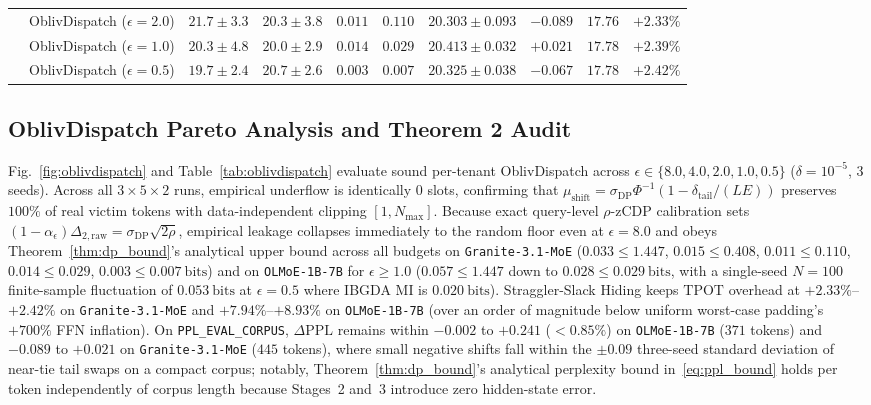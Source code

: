 \documentclass[final,5p,times,twocolumn]{elsarticle}
\def\OD{OblivDispatch}%
\theoremstyle{definition}
\theoremstyle{remark}
\newcommand{\OD}{\textsc{OblivDispatch}}
\begin{document}
\begin{table}[t]
{\begin{tabular}{llcccccccc}
      & \OD{} ($\epsilon = 2.0$) & $\mathbf{21.7 \pm 3.3}$ & $\mathbf{20.3 \pm 3.8}$ & $\mathbf{0.011}$ & $0.110$ & $20.303 \pm 0.093$ & $-0.089$ & $17.76$ & $+2.33\%$ \\
      & \OD{} ($\epsilon = 1.0$) & $\mathbf{20.3 \pm 4.8}$ & $\mathbf{20.0 \pm 2.9}$ & $\mathbf{0.014}$ & $0.029$ & $20.413 \pm 0.032$ & $+0.021$ & $17.78$ & $+2.39\%$ \\
      & \OD{} ($\epsilon = 0.5$) & $\mathbf{19.7 \pm 2.4}$ & $\mathbf{20.7 \pm 2.6}$ & $\mathbf{0.003}$ & $0.007$ & $20.325 \pm 0.038$ & $-0.067$ & $17.78$ & $+2.42\%$ \\
    \bottomrule
  \end{tabular}%
  }
\end{table}

\subsection{OblivDispatch Pareto Analysis and Theorem 2 Audit}
Fig.~\ref{fig:oblivdispatch} and Table~\ref{tab:oblivdispatch} evaluate sound per-tenant \OD{} across $\epsilon \in \{8.0, 4.0, 2.0, 1.0, 0.5\}$ ($\delta = 10^{-5}$, $3$ seeds). Across all $3 \times 5 \times 2$ runs, empirical underflow is identically $0$ slots, confirming that $\mu_{\mathrm{shift}} = \sigma_{\mathrm{DP}}\Phi^{-1}(1 - \delta_{\mathrm{tail}}/(LE))$ preserves $100\%$ of real victim tokens with data-independent clipping $[1, N_{\max}]$. Because exact query-level $\rho$-zCDP calibration sets $(1-\alpha_\epsilon)\Delta_{2,\mathrm{raw}} = \sigma_{\mathrm{DP}}\sqrt{2\rho}$, empirical leakage collapses immediately to the random floor even at $\epsilon = 8.0$ and obeys Theorem~\ref{thm:dp_bound}'s analytical upper bound across all budgets on \texttt{Granite-3.1-MoE} ($0.033 \le 1.447$, $0.015 \le 0.408$, $0.011 \le 0.110$, $0.014 \le 0.029$, $0.003 \le 0.007~\mathrm{bits}$) and on \texttt{OLMoE-1B-7B} for $\epsilon \ge 1.0$ ($0.057 \le 1.447$ down to $0.028 \le 0.029~\mathrm{bits}$, with a single-seed $N=100$ finite-sample fluctuation of $0.053~\mathrm{bits}$ at $\epsilon=0.5$ where IBGDA MI is $0.020~\mathrm{bits}$). Straggler-Slack Hiding keeps $\mathrm{TPOT}$ overhead at $+2.33\%$--$+2.42\%$ on \texttt{Granite-3.1-MoE} and $+7.94\%$--$+8.93\%$ on \texttt{OLMoE-1B-7B} (over an order of magnitude below uniform worst-case padding's $+700\%$ FFN inflation). On \texttt{PPL\_EVAL\_CORPUS}, $\Delta\mathrm{PPL}$ remains within $-0.002$ to $+0.241$ ($< 0.85\%$) on \texttt{OLMoE-1B-7B} ($371$ tokens) and $-0.089$ to $+0.021$ on \texttt{Granite-3.1-MoE} ($445$ tokens), where small negative shifts fall within the $\pm 0.09$ three-seed standard deviation of near-tie tail swaps on a compact corpus; notably, Theorem~\ref{thm:dp_bound}'s analytical perplexity bound in~\eqref{eq:ppl_bound} holds per token independently of corpus length because Stages~2 and~3 introduce zero hidden-state error.
\end{document}
